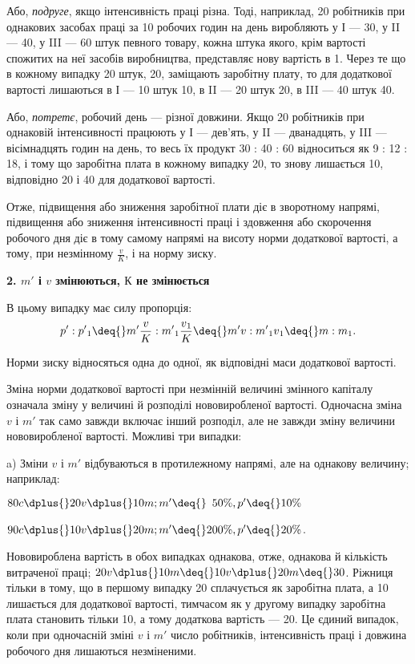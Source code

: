 Або, \emph{подруге}, якщо інтенсивність праці різна. Тоді, наприклад,
20 робітників при однакових засобах праці за 10 робочих
годин на день виробляють у І — 30, у II — 40, у III — 60 штук
певного товару, кожна штука якого, крім вартості спожитих
на неї засобів виробництва, представляє нову вартість в 1. Через те що в кожному випадку 20 штук, \deq{} 20, заміщають заробітну плату, то для додаткової
вартості лишаються в І — 10 штук \deq{} 10,
в II — 20 штук \deq{} 20, в III — 40 штук \deq{} 40.

Або, \emph{потретє}, робочий день — різної довжини. Якщо 20 робітників
при однаковій інтенсивності працюють у І — дев’ять,
у II — дванадцять, у III — вісімнадцять годин на день, то весь їх
продукт 30 : 40 : 60 відноситься як 9 : 12 : 18, і тому що заробітна
плата в кожному випадку \deq{} 20, то знову лишається 10, відповідно
20 і 40 для додаткової вартості.

Отже, підвищення або зниження заробітної плати діє в зворотному
напрямі, підвищення або зниження інтенсивності праці
і здовження або скорочення робочого дня діє в тому самому
напрямі на висоту норми додаткової вартості, а тому, при незмінному
$\frac{v}{K}$, і на норму зиску.

\begin{center}
\textbf{2. $m'$ і $v$ змінюються, $К$ не змінюється}
\end{center}
В цьому випадку має силу пропорція:\[
p': p'\textsubscript{1} \deq{} m' \frac{v}{K} : m'\textsubscript{1} \frac{v\textsubscript{1}}{K} \deq{} m'v : m'\textsubscript{1}v\textsubscript{1} \deq{} m : m\textsubscript{1}.\]

Норми зиску відносяться одна до одної, як відповідні маси
додаткової вартості.

Зміна норми додаткової вартості при незмінній величині змінного
капіталу означала зміну у величині й розподілі нововиробленої
вартості. Одночасна зміна $v$ і $m'$ так само завжди включає
інший розподіл, але не завжди зміну величини нововиробленої
вартості. Можливі три випадки:

a) Зміни $v$ і $m'$ відбуваються в протилежному напрямі, але
на однакову величину; наприклад:
\begin{center}
$80 c \dplus{} 20 v \dplus{} 10 m; m' \deq{} \phantom{0}50\%, p' \deq{} 10\%$

$90 c \dplus{} 10 v \dplus{} 20 m; m' \deq{} 200\%, p' \deq{} 20\%$.
\end{center}
Нововироблена вартість в обох випадках однакова, отже, однакова
й кількість витраченої праці; $20 v \dplus{} 10 m \deq{} 10 v \dplus{} 20 m \deq{} 30$.
Ріжниця тільки в тому, що в першому випадку 20 сплачується
як заробітна плата, а 10 лишається для додаткової вартості,
тимчасом як у другому випадку заробітна плата становить
тільки 10, а тому додаткова вартість — 20. Це єдиний випадок,
коли при одночасній зміні $v$ і $m'$ число робітників, інтенсивність
праці і довжина робочого дня лишаються незміненими.

